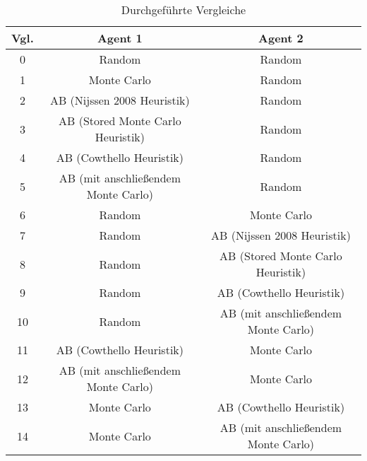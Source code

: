 \begin{table}[ht]
\begin{adjustbox}{max width=\textwidth}
\begin{tabular}{| c | c | c |} \hline
Vgl. & Agent 1 & Agent 2 \\ \hline
\hline
0  & Random                              & Random                              \\ \hline
\hline
 1 & Monte Carlo                         & Random                              \\ \hline
 2 & AB (Nijssen 2008 Heuristik)         & Random                              \\ \hline
 3 & AB (Stored Monte Carlo Heuristik)   & Random                              \\ \hline
 4 & AB (Cowthello Heuristik)            & Random                              \\ \hline
 5 & AB (mit anschließendem Monte Carlo) & Random                              \\ \hline
\hline
 6 & Random                              & Monte Carlo                         \\ \hline
 7 & Random                              & AB (Nijssen 2008 Heuristik)         \\ \hline
 8 & Random                              & AB (Stored Monte Carlo Heuristik)   \\ \hline
 9 & Random                              & AB (Cowthello Heuristik)            \\ \hline
10 & Random                              & AB (mit anschließendem Monte Carlo) \\ \hline
\hline
11 & AB (Cowthello Heuristik)            & Monte Carlo                         \\ \hline
12 & AB (mit anschließendem Monte Carlo) & Monte Carlo                         \\ \hline
13 & Monte Carlo                         & AB (Cowthello Heuristik)            \\ \hline
14 & Monte Carlo                         & AB (mit anschließendem Monte Carlo) \\ \hline
\end{tabular}
\end{adjustbox}
\caption{Durchgeführte Vergleiche}
\label{tbl:cmp-agents}
%
\end{table}

